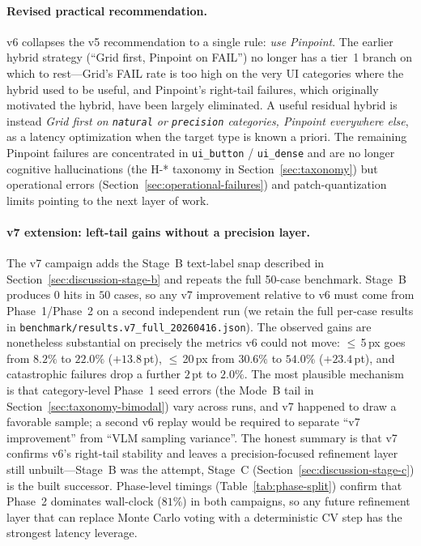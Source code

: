 \documentclass[sigconf,nonacm]{acmart}
\begin{document}
\paragraph{Revised practical recommendation.}
v6 collapses the v5 recommendation to a single rule: \emph{use
Pinpoint}.  The earlier hybrid strategy (``Grid first, Pinpoint on
FAIL'') no longer has a tier~1 branch on which to rest---Grid's FAIL
rate is too high on the very UI categories where the hybrid used to
be useful, and Pinpoint's right-tail failures, which originally
motivated the hybrid, have been largely eliminated.  A useful
residual hybrid is instead \emph{Grid first on \texttt{natural} or
\texttt{precision} categories, Pinpoint everywhere else}, as a
latency optimization when the target type is known a priori.  The
remaining Pinpoint failures are concentrated in
\texttt{ui\_button} / \texttt{ui\_dense} and are no longer
cognitive hallucinations (the H-* taxonomy in
Section~\ref{sec:taxonomy}) but operational errors
(Section~\ref{sec:operational-failures}) and patch-quantization limits
pointing to the next layer of work.

\paragraph{v7 extension: left-tail gains without a precision layer.}
The v7 campaign adds the Stage~B text-label snap described in
Section~\ref{sec:discussion-stage-b} and repeats the full 50-case
benchmark.  Stage~B produces $0$ hits in $50$ cases, so any v7
improvement relative to v6 must come from Phase~1/Phase~2 on a
second independent run (we retain the full per-case results in
\texttt{benchmark/results.v7\_full\_20260416.json}).  The observed
gains are nonetheless substantial on precisely the metrics v6 could
not move: $\leq$\,5\,px goes from $8.2\%$ to $\mathbf{22.0\%}$
($+13.8$\,pt), $\leq$\,20\,px from $30.6\%$ to $\mathbf{54.0\%}$
($+23.4$\,pt), and catastrophic failures drop a further $2$\,pt to
$\mathbf{2.0\%}$.  The most plausible mechanism is that
category-level Phase~1 seed errors (the Mode~B tail in
Section~\ref{sec:taxonomy-bimodal}) vary across runs, and v7
happened to draw a favorable sample; a second v6 replay would be
required to separate ``v7 improvement'' from ``VLM sampling
variance''.  The honest summary is that v7 confirms v6's right-tail
stability and leaves a precision-focused refinement layer still
unbuilt---Stage~B was the attempt, Stage~C
(Section~\ref{sec:discussion-stage-c}) is the built successor.
Phase-level timings (Table~\ref{tab:phase-split}) confirm that
Phase~2 dominates wall-clock ($81\%$) in both campaigns, so any
future refinement layer that can replace Monte Carlo voting with a
deterministic CV step has the strongest latency leverage.
\end{document}
